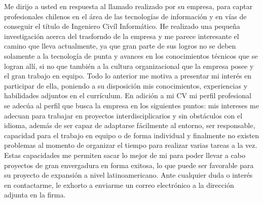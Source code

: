 \documentclass[10pt,a4paper,sans]{moderncv}        %
\begin{document}
Me dirijo a usted en respuesta al llamado realizado por su empresa, para captar profesionales chilenos en el área de las tecnologías de información y en vías de conseguir el título de Ingeniero Civíl Informático. 
He realizado una pequeña investigación acerca del trasforndo de la empresa y me parece interesante el camino que lleva actualmente, ya que gran parte de sus logros no se deben solamente a la tecnología de punta y avances en los conocimientos técnicos que se logran allí, si no que también a la cultura organizacional que la empresa posee y el gran trabajo en equipo. Todo lo anterior me motiva a presentar mi interés en participar de ella, poniendo a su disposición mis conocimientos, experiencias y habilidades adjuntos en el currículum. 
En adición a mi CV mi perfil profesional se adecúa al perfil que busca la empresa en los siguientes puntos: mis intereses me adecuan para trabajar en proyectos interdisciplicarios y sin obstáculos con el idioma, además de ser capaz de adaptarse fácilmente al entorno, ser responsable, capacidad para el trabajo en equipo o de forma individual y finalmente no existen problemas al momento de organizar el tiempo para realizar varias tareas a la vez. 
Estas capacidades me permiten sacar lo mejor de mi para poder llevar a cabo proyectos de  gran envergadura en forma exitosa, lo que puede ser favorable para su proyecto de expansión a nivel latinoamericano. 
Ante cualquier duda o interés en contactarme, le exhorto a enviarme un correo electrónico a la dirección adjunta en la firma. 


\makeletterclosing

\end{document}
